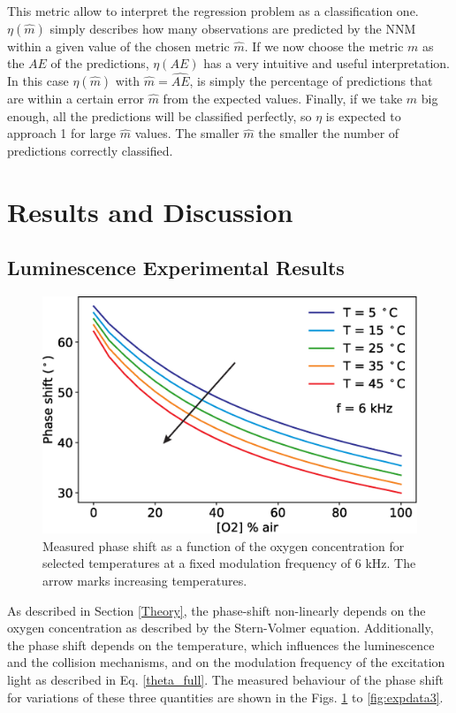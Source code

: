 \documentclass[9pt,twocolumn,twoside,pdftex]{optica}
\begin{document}
This metric allow to interpret the regression problem as a classification one. $\eta(\hat m)$ simply describes how many observations are predicted by the NNM within a given value of the chosen metric $\hat m$. If we now choose the metric $m$ as the $AE$ of the predictions, $\eta(AE)$ has a very intuitive and useful interpretation. 
In this case $\eta(\hat{m})$ with $\hat m = \hat{AE}$, is simply the percentage of predictions that are within a certain error $\hat m$ from the expected values. Finally, if we take $\hat m$ big enough, all the predictions will be classified perfectly, so $\eta$ is expected to approach 1 for large $\hat m$ values. The smaller $\hat m$ the smaller the number of predictions correctly classified. 


\section{Results and Discussion}
\label{Results}

\subsection{Luminescence Experimental Results}

\begin{figure}[b!]
\centering
\includegraphics[width=8.2 cm]{phase_O2_T.eps}
\caption{Measured phase shift as a function of the oxygen concentration for selected temperatures at a fixed modulation frequency of 6 kHz. The arrow marks increasing temperatures.}
\label{fig:expdata1}
\end{figure}

As described in Section \ref{Theory}, the phase-shift non-linearly depends on the oxygen concentration as described by the Stern-Volmer equation. Additionally, the phase shift depends on the temperature, which influences the luminescence and the collision mechanisms, and on the modulation frequency of the excitation light as described in Eq. \ref{theta_full}. The measured behaviour of the phase shift for variations of these three quantities are shown in the Figs. \ref{fig:expdata1} to \ref{fig:expdata3}.
\end{document}
